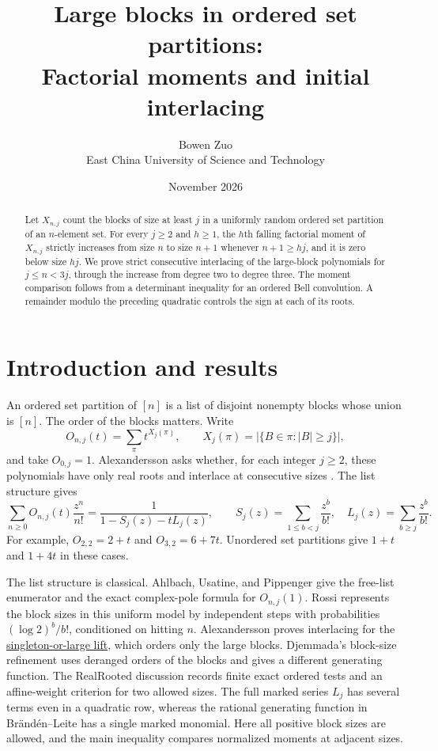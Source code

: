 \documentclass[11pt]{article}
\title{Large blocks in ordered set partitions:\\
Factorial moments and initial interlacing}
\author{Bowen Zuo\\[2pt]\small East China University of Science and Technology}
\date{November 2026}
\begin{document}
\maketitle
\begin{abstract}
Let \(X_{n,j}\) count the blocks of size at least \(j\) in a uniformly random ordered set partition of an \(n\)-element set. For every \(j\ge2\) and \(h\ge1\), the \(h\)th falling factorial moment of \(X_{n,j}\) strictly increases from size \(n\) to size \(n+1\) whenever \(n+1\ge hj\), and it is zero below size \(hj\). We prove strict consecutive interlacing of the large-block polynomials for \(j\le n<3j\), through the increase from degree two to degree three. The moment comparison follows from a determinant inequality for an ordered Bell convolution. A remainder modulo the preceding quadratic controls the sign at each of its roots.
\end{abstract}

\section{Introduction and results}

An ordered set partition of \([n]\) is a list of disjoint nonempty blocks whose union is \([n]\). The order of the blocks matters. Write
\[
O_{n,j}(t)=\sum_{\pi}t^{X_j(\pi)},\qquad X_j(\pi)=|\{B\in\pi:|B|\ge j\}|,
\]
and take \(O_{0,j}=1\). Alexandersson asks whether, for each integer \(j\ge2\), these polynomials have only real roots and interlace at consecutive sizes \cite{alex}. The list structure gives
\[
\sum_{n\ge0}O_{n,j}(t)\frac{z^n}{n!}
 =\frac{1}{1-S_j(z)-tL_j(z)},\qquad
S_j(z)=\sum_{1\le b<j}\frac{z^b}{b!},\quad L_j(z)=\sum_{b\ge j}\frac{z^b}{b!}.
\]
For example, \(O_{2,2}=2+t\) and \(O_{3,2}=6+7t\). Unordered set partitions give \(1+t\) and \(1+4t\) in these cases.

The list structure is classical. Ahlbach, Usatine, and Pippenger
\cite[Eq.~(2) and Theorems~4 and~14]{aup} give the free-list enumerator and the exact
complex-pole formula for \(O_{n,j}(1)\).
Rossi \cite[Proposition~2.1 and Remark~2.2]{rossi} represents the block sizes
in this uniform model by independent steps with probabilities
\((\log 2)^b/b!\), conditioned on hitting \(n\).
Alexandersson proves interlacing for the
\href{https://www.symmetricfunctions.com/realRootedSetPartitions.htm}{singleton-or-large lift}, which orders only the large blocks.
Djemmada's block-size refinement \cite[Theorem~4.10]{djemmada} uses
deranged orders of the blocks and gives a different generating function.
The RealRooted discussion \cite{rr} records finite exact ordered tests and
an affine-weight criterion for two allowed sizes. The full marked series
\(L_j\) has several terms even in a quadratic row, whereas the rational
generating function in Br\"and\'en--Leite \cite[Theorem~4.5]{bl} has
a single marked monomial. Here all positive block sizes are allowed, and
the main inequality compares normalized moments at adjacent sizes.
\end{document}
